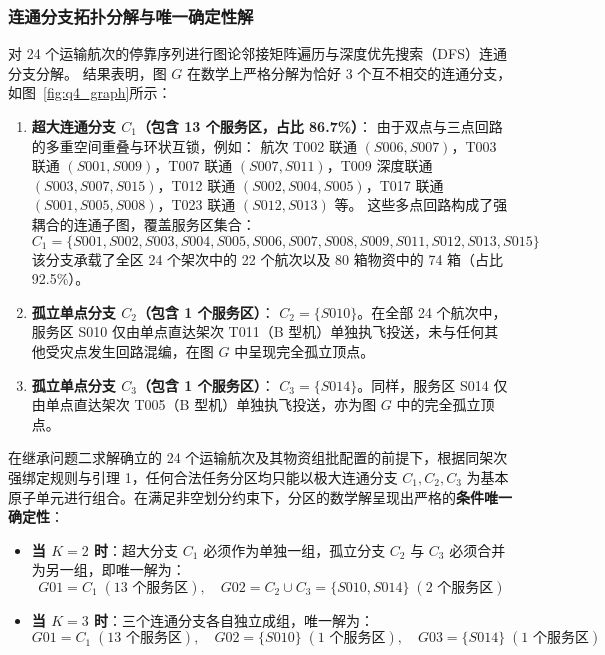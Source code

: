 \subsubsection{连通分支拓扑分解与唯一确定性解}
对 24 个运输航次的停靠序列进行图论邻接矩阵遍历与深度优先搜索（DFS）连通分支分解。
结果表明，图 $G$ 在数学上严格分解为恰好 3 个互不相交的连通分支，如图~\ref{fig:q4_graph}所示：
\begin{enumerate}
    \item \textbf{超大连通分支 $C_1$（包含 13 个服务区，占比 86.7\%）}：
    由于双点与三点回路的多重空间重叠与环状互锁，例如：
    航次 T002 联通 $(S006, S007)$，T003 联通 $(S001, S009)$，T007 联通 $(S007, S011)$，T009 深度联通 $(S003, S007, S015)$，T012 联通 $(S002, S004, S005)$，T017 联通 $(S001, S005, S008)$，T023 联通 $(S012, S013)$ 等。
    这些多点回路构成了强耦合的连通子图，覆盖服务区集合：
    \[
    C_1 = \{S001, S002, S003, S004, S005, S006, S007, S008, S009, S011, S012, S013, S015\}
    \]
    该分支承载了全区 24 个架次中的 22 个航次以及 80 箱物资中的 74 箱（占比 92.5\%）。
    
    \item \textbf{孤立单点分支 $C_2$（包含 1 个服务区）}：
    $C_2 = \{S010\}$。在全部 24 个航次中，服务区 S010 仅由单点直达架次 T011（B 型机）单独执飞投送，未与任何其他受灾点发生回路混编，在图 $G$ 中呈现完全孤立顶点。
    
    \item \textbf{孤立单点分支 $C_3$（包含 1 个服务区）}：
    $C_3 = \{S014\}$。同样，服务区 S014 仅由单点直达架次 T005（B 型机）单独执飞投送，亦为图 $G$ 中的完全孤立顶点。
\end{enumerate}

在继承问题二求解确立的 24 个运输航次及其物资组批配置的前提下，根据同架次强绑定规则与引理 1，任何合法任务分区均只能以极大连通分支 $C_1, C_2, C_3$ 为基本原子单元进行组合。在满足非空划分约束下，分区的数学解呈现出严格的\textbf{条件唯一确定性}：
\begin{itemize}
    \item \textbf{当 $K=2$ 时}：超大分支 $C_1$ 必须作为单独一组，孤立分支 $C_2$ 与 $C_3$ 必须合并为另一组，即唯一解为：
    \begin{equation}
        G01 = C_1 \; (13\text{ 个服务区}), \quad G02 = C_2 \cup C_3 = \{S010, S014\} \; (2\text{ 个服务区})
        \label{eq:k2_partition}
    \end{equation}
    
    \item \textbf{当 $K=3$ 时}：三个连通分支各自独立成组，唯一解为：
    \begin{equation}
        G01 = C_1 \; (13\text{ 个服务区}), \quad G02 = \{S010\} \; (1\text{ 个服务区}), \quad G03 = \{S014\} \; (1\text{ 个服务区})
        \label{eq:k3_partition}
    \end{equation}
\end{itemize}

